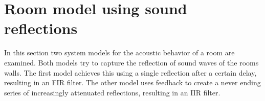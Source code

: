 \documentclass[journal]{IEEEtran}
\begin{document}

\section{Room model using sound reflections}

In this section two system models for the acoustic behavior of a room are examined. Both models try to capture the reflection of sound waves of the rooms walls. The first model achieves this using a single reflection after a certain delay, resulting in an FIR filter. The other model uses feedback to create a never ending series of increasingly attenuated reflections, resulting in an IIR filter.
\end{document}
